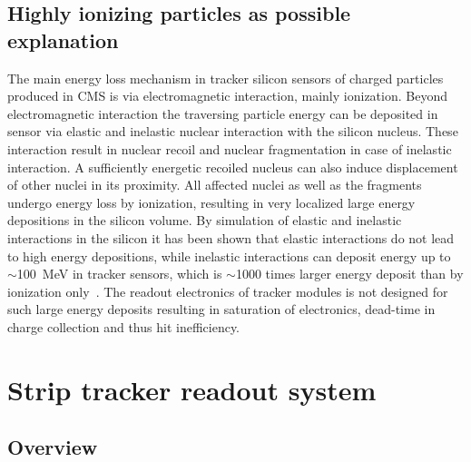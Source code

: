



\subsection{Highly ionizing particles as possible explanation}

The main energy loss mechanism in tracker silicon sensors of charged particles produced in CMS is via electromagnetic interaction, mainly ionization. Beyond electromagnetic interaction the traversing particle energy can be deposited in sensor via elastic and inelastic nuclear interaction with the silicon nucleus. These interaction result in nuclear recoil and nuclear fragmentation in case of inelastic interaction. A sufficiently energetic recoiled nucleus can also induce displacement of other nuclei in its proximity. All affected nuclei as well as the fragments undergo energy loss by ionization, resulting in very localized large energy depositions in the silicon volume. By simulation of elastic and inelastic interactions in the silicon it has been shown that elastic interactions do not lead to high energy depositions, while inelastic interactions can deposit energy up to $\sim$100~MeV in tracker sensors, which is $\sim$1000 times larger energy deposit than by ionization only~\cite{Huhtinen:2002yda}. The readout electronics of tracker modules is not designed for such large energy deposits resulting in saturation of electronics, dead-time in charge collection and thus hit inefficiency.

\section{Strip tracker readout system}

\subsection{Overview}

